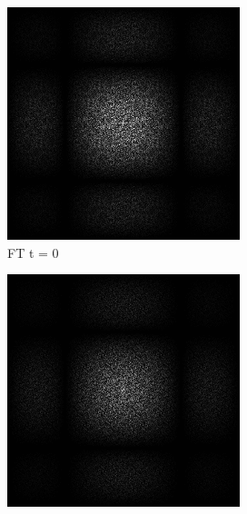 \begin{figure}[H]
    \centering
    \begin{subfigure}[b]{0.2\linewidth}
      \includegraphics[width=\linewidth]{content/TemporalerAlg/Bilder/Retargeting/Bedeutung Retargeting/SortSerie/seed_debug_3.0_small.png}
       \caption{FT t = 0}
       \label{pic:sortier_t0}
    \end{subfigure}
    \begin{subfigure}[b]{0.2\linewidth}
      \includegraphics[width=\linewidth]{content/TemporalerAlg/Bilder/Retargeting/Bedeutung Retargeting/SortSerie/seed_debug_4.0_small.png}

\end{subfigure}
\end{figure}
